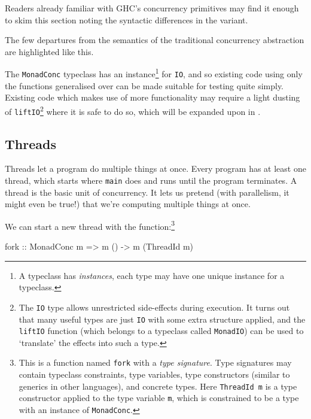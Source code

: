 Readers already familiar with GHC's concurrency primitives may find it
enough to skim this section noting the syntactic differences in the
\dejafu{} variant.

\begin{departure}
  The few departures from the semantics of the traditional concurrency
  abstraction are highlighted like this.
\end{departure}

The \verb|MonadConc| typeclass has an instance\footnote{A typeclass
  has \emph{instances}, each type may have one unique instance for a
  typeclass.} for \verb|IO|, and so existing code using only the
functions generalised over can be made suitable for testing quite
simply. Existing code which makes use of more functionality may
require a light dusting of \verb|liftIO|\footnote{The \texttt{IO} type
  allows unrestricted side-effects during execution. It turns out that
  many useful types are just \texttt{IO} with some extra structure
  applied, and the \texttt{liftIO} function (which belongs to a
  typeclass called \texttt{MonadIO}) can be used to `translate' the
  effects into such a type.} where it is safe to do so, which will be
expanded upon in .

\subsection{Threads}
\label{sec:abstraction-typeclass-threads}

Threads let a program do multiple things at once. Every program has at
least one thread, which starts where \verb|main| does and runs until
the program terminates. A thread is the basic unit of concurrency. It
lets us pretend (with parallelism, it might even be true!) that we're
computing multiple things at once.

We can start a new thread with the function:\footnote{This is a
  function named \texttt{fork} with a \emph{type signature}. Type
  signatures may contain typeclass constraints, type variables, type
  constructors (similar to generics in other languages), and concrete
  types. Here \texttt{ThreadId m} is a type constructor applied to the
  type variable \texttt{m}, which is constrained to be a type with an
  instance of \texttt{MonadConc}.}

\begin{haskellcode}
fork :: MonadConc m => m () -> m (ThreadId m)
\end{haskellcode}

